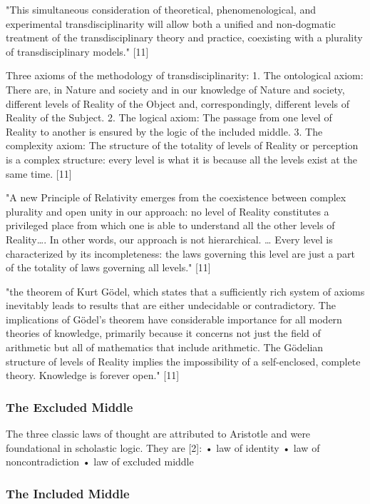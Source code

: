 "This simultaneous consideration of theoretical, phenomenological, and experimental transdisciplinarity will allow both a unified and non-dogmatic treatment of the transdisciplinary theory and practice, coexisting with a plurality of transdisciplinary models." [11]

Three axioms of the methodology of transdisciplinarity:
1. The ontological axiom: There are, in Nature and society and in our knowledge of Nature and society, different levels of Reality of the Object and, correspondingly, different levels of Reality of the Subject.
2. The logical axiom: The passage from one level of Reality to another is ensured by the logic of the included middle.
3. The complexity axiom: The structure of the totality of levels of Reality or perception is a complex structure: every level is what it is because all the levels exist at the same time. [11]

"A new Principle of Relativity emerges from the coexistence between complex plurality and open unity in our approach: no level of Reality constitutes a privileged place from which one is able to understand all the other levels of Reality…. In other words, our approach is not hierarchical. … Every level is characterized by its incompleteness: the laws governing this level are just a part of the totality of laws governing all levels." [11]

"the theorem of Kurt Gödel, which states that a sufficiently rich system of axioms inevitably leads to results that are either undecidable or contradictory. The implications of Gödel’s theorem have considerable importance for all modern theories of knowledge, primarily because it concerns not just the field of arithmetic but all of mathematics that include arithmetic. The Gödelian structure of levels of Reality implies the impossibility of a self-enclosed, complete theory. Knowledge is forever open." [11]

\subsubsection{The Excluded Middle}

The three classic laws of thought are attributed to Aristotle and were foundational in scholastic logic. They are [2]:
•	law of identity
•	law of noncontradiction
•	law of excluded middle

\subsubsection{The Included Middle}

